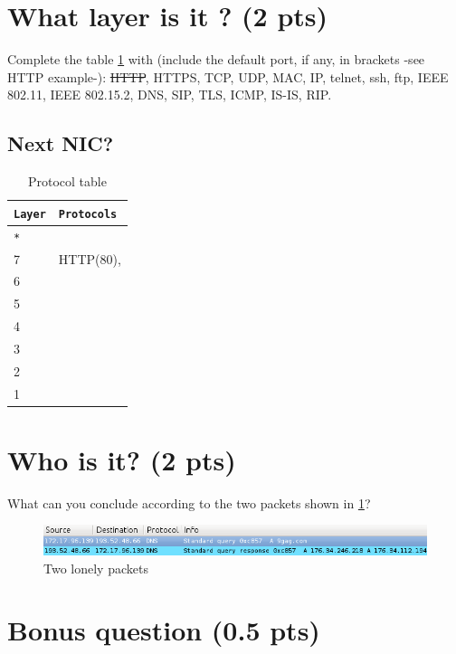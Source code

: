 \documentclass[11pt]{article}
\begin{document}
\pagebreak
\section{What layer is it ? (2 pts)}
	Complete the table \ref{tab:protocol} with (include the default port, if any, in brackets -see HTTP example-): \sout{HTTP}, HTTPS, TCP, UDP, MAC, IP, telnet, ssh, ftp, IEEE 802.11, IEEE 802.15.2, DNS, SIP, TLS, ICMP, IS-IS, RIP.
	\subsection{Next NIC?}
		\renewcommand{\arraystretch}{1.5}
			\begin{table}[h]
			      \begin{tabular}{l|l}
			      		\verb+Layer+	&	\verb+Protocols+	\\ \hline
						\verb+*+		&	\\
			      		7				&	HTTP(80),			\\
			      		6				&	\\
			      		5				&	\\
			      		4				&	\\
			      		3				&	\\
			      		2				&	\\
			      		1				&	\\
			      \end{tabular}
			      \caption{Protocol table}
			  \label{tab:protocol}
			\end{table}
		\renewcommand{\arraystretch}{1.0}

	\section{Who is it? (2 pts)}
		What can you conclude according to the two packets shown in \ref{fig:dns}?
		\begin{figure}[h]
			\begin{center}
				\includegraphics[width=18cm]{dns.png}
				\caption{Two lonely packets}
				\label{fig:dns}
			\end{center}
		\end{figure}
		\vspace{1cm}

\section{Bonus question (0.5 pts)}
\end{document}
